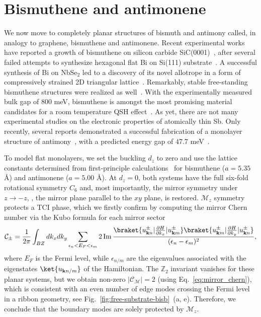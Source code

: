 \section{Bismuthene and antimonene}
\label{sec:bismuthene-antimonene}
We now move to completely planar structures of bismuth and antimony called, in analogy to graphene, bismuthene and antimonene. Recent experimental works have reported a growth of bismuthene on silicon carbide SiC(0001)~\cite{Reis287}, after several failed attempts to synthesize hexagonal flat Bi on Si(111) substrate~\cite{KUZUMAKI20101044, Miwa_2003}. A successful synthesis of Bi on NbSe$_2$ led to a discovery of its novel allotrope in a form of compressively strained 2D triangular lattice~\cite{Fangeaaq0330}. Remarkably, stable free-standing bismuthene structures were realized as well~\cite{Yang2020}. With the experimentally measured bulk gap of 800 meV, bismuthene is amongst the most promising material candidates for a room temperature QSH effect~\cite{AsSbBiSiC1, AsSbBiSiC2}. As yet, there are not many experimental studies on the electronic properties of atomically thin Sb. Only recently, several reports demonstrated a successful fabrication of a monolayer structure of antimony~\cite{SbonAg, SbSyntMBA, SbonGe}, with a predicted energy gap of $47.7$ meV~\cite{SbonAg}.

To model flat monolayers, we set the buckling $d_z$ to zero and use the lattice constants determined from first-principle calculations~\cite{Hsu_2015} for bismuthene ($a = 5.35$ \AA) and antimonene ($a = 5.00$ \AA). At $d_z = 0$, both systems have the full six-fold rotational symmetry $C_6$ and, most importantly, the mirror symmetry under $z \rightarrow -z$, \ie, the mirror plane parallel to the $xy$ plane, is restored. $\mathcal{M}_z$ symmetry protects a TCI phase, which we firstly confirm by computing the mirror Chern number via the Kubo formula for each mirror sector~\cite{Hsu2016} 
\begin{equation}
\mathcal{C}_{\pm} = \frac{1}{2 \pi} \int_{BZ}   d k_x d k_y \sum_{\epsilon_n < E_F < \epsilon_m} 2 \, \mathrm{Im} \, \frac{\braket{u^{\pm}_{\mathbf{k} n} | \frac{\partial H}{\partial k_x}  |  u^{\pm}_{\mathbf{k} m}}    \braket{u^{\pm}_{\mathbf{k} m} | \frac{\partial H}{\partial k_y}  |  u^{\pm}_{\mathbf{k} n}}}{ (\epsilon_n - \epsilon_m)^2},
\label{eq:mirror-chern-num}
\end{equation}
where $E_F$ is the Fermi level, while $\epsilon_{n/m}$ are the eigenvalues associated with the eigenstates $\ket{u_{\mathbf{k} n/m}}$ of the Hamiltonian. The $\mathbb{Z}_2$ invariant vanishes for these planar systems, but we obtain non-zero $|\mathcal{C}_{\mathcal{M}}| = 2 $ (using Eq.~\eqref{eq:mirror_chern}), which is consistent with an even number of edge modes crossing the Fermi level in a ribbon geometry, see Fig.~\ref{fig:free-substrate-bisb}~(a, e). Therefore, we conclude that the boundary modes are solely protected by $\mathcal{M}_z$.

